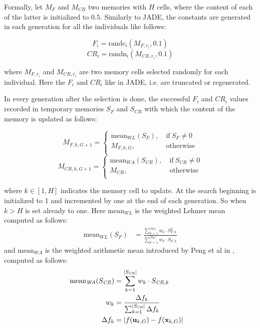 Formally, let $M_{F}$ and $M_{\textit{CR}}$ two memories with $H$ cells, where the content of each of the latter is initialized to $0.5$. Similarly to JADE, the constants are generated in each generation for all the individuals like follows:
\begin{center}
	\begin{equation}
		F_i = \textrm{randc}_{i}(M_{F, r_{i}}, 0.1)
	\end{equation}
	\begin{equation}
		\textit{CR}_i = \textrm{randn}_{i}(M_{\textit{CR},r_{i}}, 0.1)
	\end{equation}
\end{center}
where $M_{F, r_{i}}$ and $M_{\textit{CR}, r_{i}}$ are two memory cells selected randomly for each individual. Here the $F_{i}$ and $\textit{CR}_{i}$ like in JADE, i.e. are truncated or regenerated.

In every generation after the selection is done, the successful $F_{i}$ and $\textit{CR}_{i}$ values recorded in temporary memories $S_{F}$ and $S_{\textit{CR}}$ with which the content of the memory is updated as follows:
\begin{center}
	\begin{equation}
		M_{F,k,G+1} = \begin{cases}
			\textrm{mean}_{\textit{WL}}(S_{F}),&\ \textrm{if}\ S_{F} \neq 0 \\
			M_{F,k,G},&\ \textrm{otherwise} \\
		\end{cases}
	\end{equation}
	\begin{equation}
		M_{\textit{CR}, k, G + 1} = \begin{cases}
			\textrm{mean}_{\textit{WA}}(S_{\textit{CR}}),&\ \textrm{if}\ S_{\textit{CR}} \neq 0 \\
			M_{\textit{CR}},&\ \textrm{otherwise} \\
		\end{cases}
	\end{equation}
\end{center}
where $k \in [1, H]$ indicates the memory cell to update. At the search beginning is initialized to 1 and incremented by one at the end of each generation. So when $k > H$ is set already to one. Here $\textrm{mean}_{\textit{WL}}$ is the weighted Lehmer mean computed as follows:
\begin{align}
	\textrm{mean}_{\textit{WL}}(S_{F}) &= \frac{\sum_{k=1}^{|S_{F}|}w_{k} \cdot S_{F,k}^2}{\sum_{k=1}^{|S_{F}|}w_{k} \cdot S_{F,k}}
\end{align}
and $\textrm{mean}_{\textit{WA}}$ is the weighted arithmetic mean introduced by Peng et al in \cite{MSJADE:2009}, computed as follows:
\begin{align}
	\textrm{mean}_{\textit{WA}}(S_{\textit{CR}}) &= \sum\limits_{k=1}^{|S_{\textit{CR}}|}w_{k}\cdot S_{\textit{CR},k} \cr
	w_k &= \frac{\Delta f_{k}}{\sum_{k=1}^{|S_{\textit{CR}}|}\Delta f_{k}} \cr
	\Delta f_{k} &= |f(\textbf{u}_{k,G}) - f(\textbf{x}_{k,G})|
\end{align}
